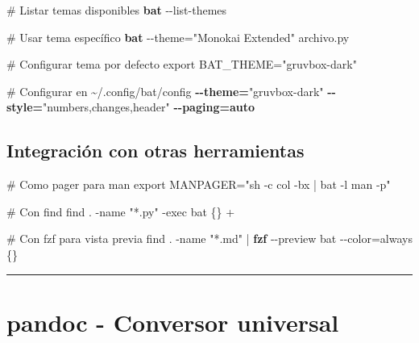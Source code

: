 \documentclass[
  11pt,
  letterpaper,
  oneside,
  openany]{scrbook}
\newenvironment{Shaded}{}{}
\newcommand{\AttributeTok}[1]{\textcolor[rgb]{0.84,0.23,0.29}{#1}}
\newcommand{\BuiltInTok}[1]{\textcolor[rgb]{0.84,0.23,0.29}{#1}}
\newcommand{\CommentTok}[1]{\textcolor[rgb]{0.42,0.45,0.49}{#1}}
\newcommand{\ExtensionTok}[1]{\textcolor[rgb]{0.84,0.23,0.29}{\textbf{#1}}}
\newcommand{\FunctionTok}[1]{\textcolor[rgb]{0.44,0.26,0.76}{#1}}
\newcommand{\KeywordTok}[1]{\textcolor[rgb]{0.84,0.23,0.29}{#1}}
\newcommand{\NormalTok}[1]{\textcolor[rgb]{0.14,0.16,0.18}{#1}}
\newcommand{\OperatorTok}[1]{\textcolor[rgb]{0.14,0.16,0.18}{#1}}
\newcommand{\StringTok}[1]{\textcolor[rgb]{0.01,0.18,0.38}{#1}}
\newcommand{\VariableTok}[1]{\textcolor[rgb]{0.89,0.38,0.04}{#1}}
\begin{document}
\begin{Shaded}
\begin{Highlighting}[]
\CommentTok{\# Listar temas disponibles}
\ExtensionTok{bat} \AttributeTok{{-}{-}list{-}themes}

\CommentTok{\# Usar tema específico}
\ExtensionTok{bat} \AttributeTok{{-}{-}theme}\OperatorTok{=}\StringTok{"Monokai Extended"}\NormalTok{ archivo.py}

\CommentTok{\# Configurar tema por defecto}
\BuiltInTok{export} \VariableTok{BAT\_THEME}\OperatorTok{=}\StringTok{"gruvbox{-}dark"}

\CommentTok{\# Configurar en \textasciitilde{}/.config/bat/config}
\ExtensionTok{{-}{-}theme=}\StringTok{"gruvbox{-}dark"}
\ExtensionTok{{-}{-}style=}\StringTok{"numbers,changes,header"}
\ExtensionTok{{-}{-}paging=auto}
\end{Highlighting}
\end{Shaded}

\subsection{Integración con otras
herramientas}\label{integraciuxf3n-con-otras-herramientas-1}

\begin{Shaded}
\begin{Highlighting}[]
\CommentTok{\# Como pager para man}
\BuiltInTok{export} \VariableTok{MANPAGER}\OperatorTok{=}\StringTok{"sh {-}c \textquotesingle{}col {-}bx | bat {-}l man {-}p\textquotesingle{}"}

\CommentTok{\# Con find}
\FunctionTok{find}\NormalTok{ . }\AttributeTok{{-}name} \StringTok{"*.py"} \AttributeTok{{-}exec}\NormalTok{ bat \{\} +}

\CommentTok{\# Con fzf para vista previa}
\FunctionTok{find}\NormalTok{ . }\AttributeTok{{-}name} \StringTok{"*.md"} \KeywordTok{|} \ExtensionTok{fzf} \AttributeTok{{-}{-}preview} \StringTok{\textquotesingle{}bat {-}{-}color=always \{\}\textquotesingle{}}
\end{Highlighting}
\end{Shaded}

\begin{center}\rule{0.5\linewidth}{0.5pt}\end{center}

\section{pandoc - Conversor universal}\label{sec-pandoc}
\end{document}
